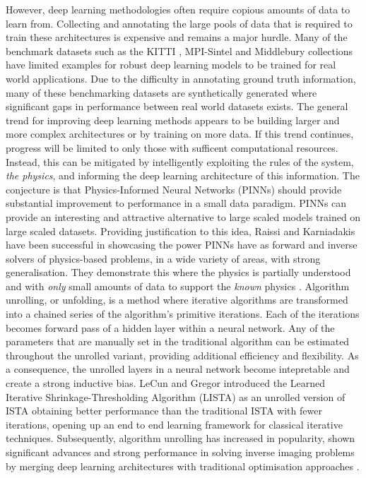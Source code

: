 \IEEEPARstart{} However, deep learning methodologies often require copious amounts of data to learn from. Collecting and annotating the large pools of data that is required to train these architectures is expensive and remains a major hurdle. Many of the benchmark datasets such as the KITTI \cite{geiger2012we}, MPI-Sintel \cite{butler2012naturalistic} and Middlebury \cite{baker2011database} collections have limited examples for robust deep learning models to be trained for real world applications. Due to the difficulty in annotating ground truth information, many of these benchmarking datasets are synthetically generated where significant gaps in performance between real world datasets exists. 
\IEEEPARstart{} The general trend for improving deep learning methods appears to be building larger and more complex architectures or by training on more data. If this trend continues, progress will be limited to only those with sufficent computational resources. Instead, this can be mitigated by intelligently exploiting the rules of the system, \textit{the physics}, and informing the deep learning architecture of this information. The conjecture is that Physics-Informed Neural Networks (PINNs) should provide substantial improvement to performance in a small data paradigm. PINNs can provide an interesting and attractive alternative to large scaled models trained on large scaled datasets. Providing justification to this idea, Raissi and Karniadakis have been successful in showcasing the power PINNs have as forward and inverse solvers of physics-based problems, in a wide variety of areas, with strong generalisation. They demonstrate this where the physics is partially understood and with \textit{only} small amounts of data to support the \textit{known} physics \cite{raissi2017physics, raissi2017machine, raissi2019physics, karniadakis2021physics}. 
\IEEEPARstart{}{} Algorithm unrolling, or unfolding, is a method where iterative algorithms are transformed into a chained series of the algorithm's primitive iterations. Each of the iterations becomes forward pass of a hidden layer within a neural network. Any of the parameters that are manually set in the traditional algorithm can be estimated throughout the unrolled variant, providing additional efficiency and flexibility. As a consequence, the unrolled layers in a neural network become intepretable and create a strong inductive bias. LeCun and Gregor introduced the Learned Iterative Shrinkage-Thresholding Algorithm (LISTA) as an unrolled version of ISTA \cite{gregor2010learning} obtaining better performance than the traditional ISTA with fewer iterations, opening up an end to end learning framework for classical iterative techniques. Subsequently, algorithm unrolling has increased in popularity, shown significant advances and strong performance in solving inverse imaging problems by merging deep learning architectures with traditional optimisation approaches \cite{monga2021algorithm,yang2016deep, diamond2017unrolled}.
